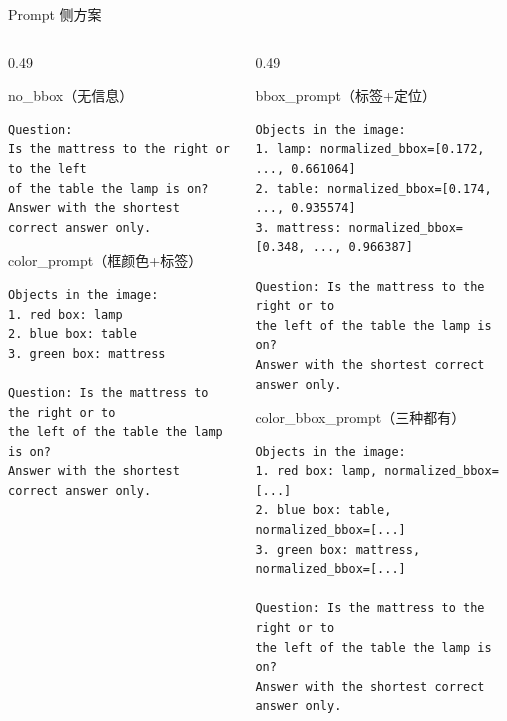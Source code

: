 \documentclass{beamer}
\begin{document}
\begin{frame}[fragile]{Prompt 侧方案}
\small
\begin{columns}[T,onlytextwidth]
\begin{column}{0.49\textwidth}
\begin{block}{no\_bbox（无信息）}
\tiny
\begin{verbatim}
Question:
Is the mattress to the right or to the left
of the table the lamp is on?
Answer with the shortest correct answer only.
\end{verbatim}
\end{block}
\begin{block}{color\_prompt（框颜色+标签）}
\tiny
\begin{verbatim}
Objects in the image:
1. red box: lamp
2. blue box: table
3. green box: mattress

Question: Is the mattress to the right or to
the left of the table the lamp is on?
Answer with the shortest correct answer only.
\end{verbatim}
\end{block}
\end{column}
\begin{column}{0.49\textwidth}
\begin{block}{bbox\_prompt（标签+定位）}
\tiny
\begin{verbatim}
Objects in the image:
1. lamp: normalized_bbox=[0.172, ..., 0.661064]
2. table: normalized_bbox=[0.174, ..., 0.935574]
3. mattress: normalized_bbox=[0.348, ..., 0.966387]

Question: Is the mattress to the right or to
the left of the table the lamp is on?
Answer with the shortest correct answer only.
\end{verbatim}
\end{block}
\begin{block}{color\_bbox\_prompt（三种都有）}
\tiny
\begin{verbatim}
Objects in the image:
1. red box: lamp, normalized_bbox=[...]
2. blue box: table, normalized_bbox=[...]
3. green box: mattress, normalized_bbox=[...]

Question: Is the mattress to the right or to
the left of the table the lamp is on?
Answer with the shortest correct answer only.
\end{verbatim}
\end{block}
\end{column}
\end{columns}
\end{frame}
\end{document}
